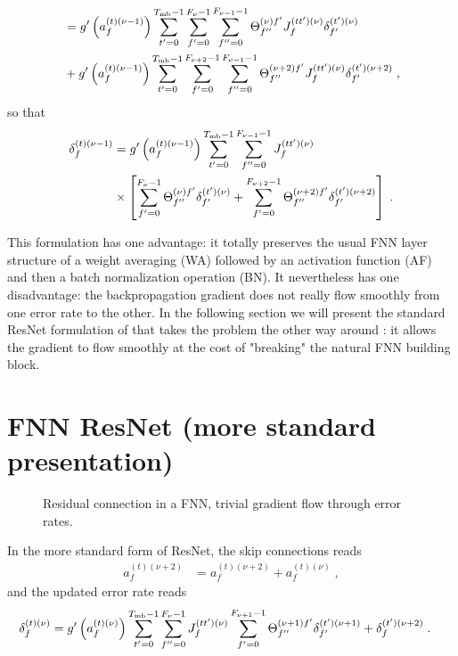 \begin{subappendices}
\begin{align}
%
&=g'\left(a_{f}^{(t)(\nu-1)}\right)
%
\sum_{t'=0}^{T_{{\rm mb}}-1}\sum_{f'=0}^{F_{\nu}-1}\sum^{F_{\nu-1}-1}_{f''=0}\Theta^{(\nu)f'}_{f''}
%
J^{(tt')(\nu)}_{f} \delta^{(t')(\nu)}_{f'}\notag\\
%
&+g'\left(a_{f}^{(t)(\nu-1)}\right)
%
\sum_{t'=0}^{T_{{\rm mb}}-1}\sum_{f'=0}^{F_{\nu+2}-1}\sum^{F_{\nu-1}-1}_{f''=0}\Theta^{(\nu+2)f'}_{f''}
%
J^{(tt')(\nu)}_{f} \delta^{(t')(\nu+2)}_{f'}\;,
\end{align}
so that
\begin{align}
\delta^{(t)(\nu-1)}_f&=g'\left(a_{f}^{(t)(\nu-1)}\right)
%
\sum_{t'=0}^{T_{{\rm mb}}-1}\sum^{F_{\nu-1}-1}_{f''=0}J^{(tt')(\nu)}_{f}\notag\\
%
&\times\left[\sum_{f'=0}^{F_{\nu}-1}\Theta^{(\nu)f'}_{f''}\delta^{(t')(\nu)}_{f'}+
%
\sum_{f'=0}^{F_{\nu+2}-1}\Theta^{(\nu+2)f'}_{f''}\delta^{(t')(\nu+2)}_{f'}\right]\;.
\end{align}

This formulation has one advantage: it totally preserves the usual FNN layer structure of a weight averaging (WA) followed by an activation function (AF) and then a batch normalization operation (BN). It nevertheless has one disadvantage: the backpropagation gradient does not really flow smoothly from one error rate to the other. In the following section we will present the standard ResNet formulation of that takes the problem the other way around : it allows the gradient to flow smoothly at the cost of "breaking" the natural FNN building block.

\section{FNN ResNet (more standard presentation)} \label{sec:ResnetFNN2}

\begin{figure}[H]
\begin{center}
\end{center}
\caption{\label{fig:fc_resnet_3} Residual connection in a FNN, trivial gradient flow through error rates.}
\end{figure}

In the more standard form of ResNet, the skip connections reads
\begin{align}
 a_{f}^{(t)(\nu+2)}&= a_{f}^{(t)(\nu+2)}+ a_{f}^{(t)(\nu)}\;,
\end{align}
and the updated error rate reads
\begin{align}
\delta^{(t)(\nu)}_f&=g'\left(a_{f}^{(t)(\nu)}\right)
%
\sum_{t'=0}^{T_{{\rm mb}}-1}\sum^{F_{\nu}-1}_{f''=0}J^{(tt')(\nu)}_{f}
%
\sum_{f'=0}^{F_{\nu+1}-1}\Theta^{(\nu+1)f'}_{f''}\delta^{(t')(\nu+1)}_{f'}+\delta^{(t')(\nu+2)}_{f}\;.
\end{align}



\end{subappendices}

